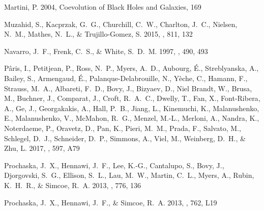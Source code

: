 \documentclass[iop]{emulateapj}
\begin{document}
\begin{thebibliography}{45}
{Martini}, P. 2004, Coevolution of Black Holes and Galaxies, 169

{Muzahid}, S., {Kacprzak}, G.~G., {Churchill}, C.~W., {Charlton}, J.~C.,
  {Nielsen}, N.~M., {Mathes}, N.~L., \& {Trujillo-Gomez}, S. 2015, \apj, 811,
  132

{Navarro}, J.~F., {Frenk}, C.~S., \& {White}, S.~D.~M. 1997, \apj, 490, 493

{P{\^a}ris}, I., {Petitjean}, P., {Ross}, N.~P., {Myers}, A.~D., {Aubourg},
  {\'E}., {Streblyanska}, A., {Bailey}, S., {Armengaud}, {\'E}.,
  {Palanque-Delabrouille}, N., {Y{\`e}che}, C., {Hamann}, F., {Strauss}, M.~A.,
  {Albareti}, F.~D., {Bovy}, J., {Bizyaev}, D., {Niel Brandt}, W., {Brusa}, M.,
  {Buchner}, J., {Comparat}, J., {Croft}, R.~A.~C., {Dwelly}, T., {Fan}, X.,
  {Font-Ribera}, A., {Ge}, J., {Georgakakis}, A., {Hall}, P.~B., {Jiang}, L.,
  {Kinemuchi}, K., {Malanushenko}, E., {Malanushenko}, V., {McMahon}, R.~G.,
  {Menzel}, M.-L., {Merloni}, A., {Nandra}, K., {Noterdaeme}, P., {Oravetz},
  D., {Pan}, K., {Pieri}, M.~M., {Prada}, F., {Salvato}, M., {Schlegel}, D.~J.,
  {Schneider}, D.~P., {Simmons}, A., {Viel}, M., {Weinberg}, D.~H., \& {Zhu},
  L. 2017, \aap, 597, A79

{Prochaska}, J.~X., {Hennawi}, J.~F., {Lee}, K.-G., {Cantalupo}, S., {Bovy},
  J., {Djorgovski}, S.~G., {Ellison}, S.~L., {Lau}, M.~W., {Martin}, C.~L.,
  {Myers}, A., {Rubin}, K.~H.~R., \& {Simcoe}, R.~A. 2013{}, \apj,
  776, 136

{Prochaska}, J.~X., {Hennawi}, J.~F., \& {Simcoe}, R.~A. 2013{},
  \apjl, 762, L19


\end{thebibliography}
\end{document}
